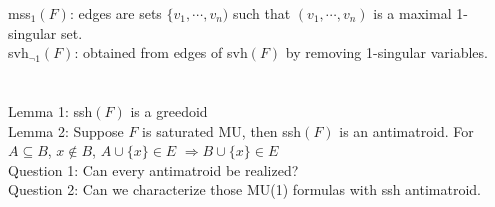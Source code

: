 \documentclass[12pt]{article}
\begin{document}
mss$_1(F)$: edges are sets $\{v_1,\cdots, v_n)$ such that $(v_1,\cdots,v_n)$ is a maximal 1-singular set.
\\

svh$_{\neg 1}(F)$: obtained from edges of svh$(F)$ by removing 1-singular variables.

\section{}

Lemma 1: ssh$(F)$ is a greedoid\\

Lemma 2: Suppose $F$ is saturated MU, then ssh$(F)$ is an antimatroid. For $A\subseteq B$, $x\not\in B$, $A\cup\{x\}\in E$ $\Longrightarrow B\cup\{x\}\in E$
\\

Question 1: Can every antimatroid be realized?
\\

Question 2: Can we characterize those MU(1) formulas with ssh antimatroid.

\end{document}
